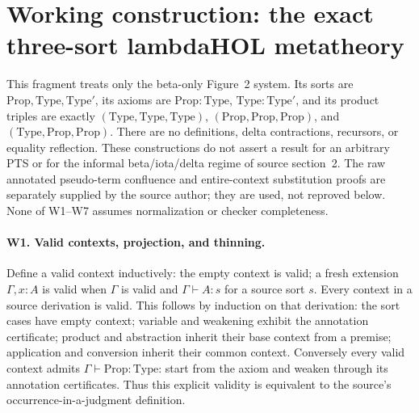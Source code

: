 
\section*{Working construction: the exact three-sort lambdaHOL metatheory}

This fragment treats only the beta-only Figure~2 system. Its sorts are
\(\mathrm{Prop},\mathrm{Type},\mathrm{Type}'\), its axioms are
\(\mathrm{Prop}:\mathrm{Type}\), \(\mathrm{Type}:\mathrm{Type}'\),
and its product triples are exactly
\((\mathrm{Type},\mathrm{Type},\mathrm{Type})\),
\((\mathrm{Prop},\mathrm{Prop},\mathrm{Prop})\), and
\((\mathrm{Type},\mathrm{Prop},\mathrm{Prop})\).
There are no definitions, delta contractions, recursors, or equality
reflection. These constructions do not assert a result for an arbitrary
PTS or for the informal beta/iota/delta regime of source section~2.
The raw annotated pseudo-term confluence and entire-context substitution
proofs are separately supplied by the source author; they are used, not
reproved below. None of W1--W7 assumes normalization or checker completeness.

\paragraph{W1. Valid contexts, projection, and thinning.}
Define a valid context inductively: the empty context is valid; a fresh
extension \(\Gamma,x:A\) is valid when \(\Gamma\) is valid and
\(\Gamma\vdash A:s\) for a source sort \(s\). Every context in a
source derivation is valid. This follows by induction on that derivation:
the sort cases have empty context; variable and weakening exhibit the
annotation certificate; product and abstraction inherit their base
context from a premise; application and conversion inherit their common
context. Conversely every valid context admits
\(\Gamma\vdash\mathrm{Prop}:\mathrm{Type}\): start from the axiom and
weaken through its annotation certificates. Thus this explicit validity
is equivalent to the source's occurrence-in-a-judgment definition.


